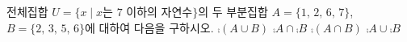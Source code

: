 전체집합 $U=\{x \mid x$는 $7$ 이하의 자연수$\}$의 두 부분집합 $A=\{1,\,2,\,6,\,7\}$, $B=\{2,\,3,\,5,\,6\}$에 대하여 다음을 구하시오.
 $\comp{(A\cup B)}$
 $\comp{A}\cap\comp{B}$
 $\comp{(A\cap B)}$
 $\comp{A}\cup\comp{B}$
